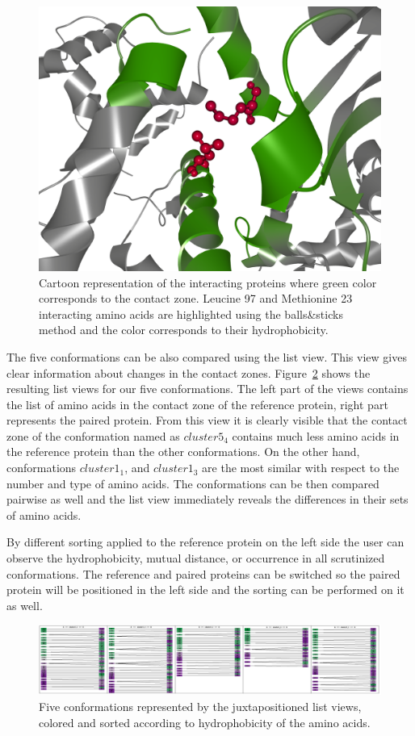 \documentclass[journal]{vgtc}                %
\begin{document}
\begin{figure}[bt]
  \centering
  \includegraphics[width=0.8\columnwidth]{contact.png}
  \caption{Cartoon representation of the interacting proteins where green color corresponds to the contact zone. Leucine 97 and Methionine 23 interacting amino acids are highlighted using the balls\&sticks method and the color corresponds to their hydrophobicity.}
  \label{fig:contact}
\end{figure}

The five conformations can be also compared using the list view.
This view gives clear information about changes in the contact zones.
Figure~\ref{fig:case3} shows the resulting list views for our five conformations.
The left part of the views contains the list of amino acids in the contact zone of the reference protein, right part represents the paired protein.
From this view it is clearly visible that the contact zone of the conformation named as $cluster5_4$ contains much less amino acids in the reference protein than the other conformations.
On the other hand, conformations $cluster1_1$, and $cluster1_3$ are the most similar with respect to the number and type of amino acids. 
The conformations can be then compared pairwise as well and the list view immediately reveals the differences in their sets of amino acids.

By different sorting applied to the reference protein on the left side the user can observe the hydrophobicity, mutual distance, or occurrence in all scrutinized conformations.
The reference and paired proteins can be switched so the paired protein will be positioned in the left side and the sorting can be performed on it as well.

\begin{figure}[bt]
  \centering
  \includegraphics[width=1.0\linewidth]{case3.png}
  \caption{Five conformations represented by the juxtapositioned list views, colored and sorted according to hydrophobicity of the amino acids.}
  \label{fig:case3}
\end{figure}
\end{document}

